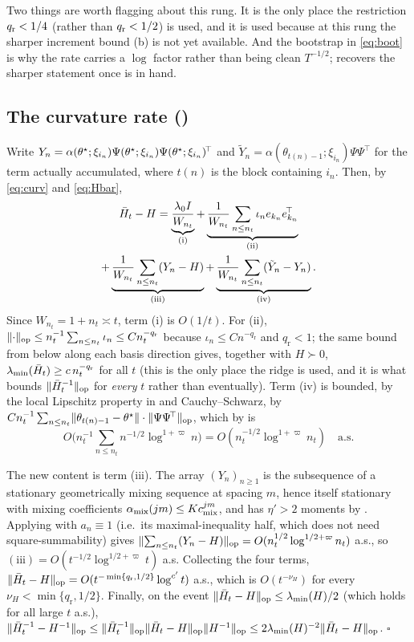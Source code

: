 \noindent
Two things are worth flagging about this rung. It is the only place the restriction
$q_{\mathrm r}<1/4$ (rather than $q_{\mathrm r}<1/2$) is used, and it is used because at this rung the sharper
increment bound (b) is not yet available. And the bootstrap in \eqref{eq:boot} is
why the rate carries a $\log$ factor rather than being clean $T^{-1/2}$; 
recovers the sharper statement once  is in hand.

\subsection{The curvature rate (\texorpdfstring{}{Theorem})}

Write $Y_n=\alpha(\theta^\star;\xi_{i_n})\Psi(\theta^\star;\xi_{i_n})\Psi(\theta^\star;\xi_{i_n})^{\!\top}$ and
$\tilde Y_n=\alpha(\theta_{t(n)-1};\xi_{i_n})\Psi\Psi^{\!\top}$ for the term actually
accumulated, where $t(n)$ is the block containing $i_n$. Then, by \eqref{eq:curv} and
\eqref{eq:Hbar},
\begin{multline}
\bar{H}_t-H
=\underbrace{\frac{\lambda_0 I}{W_{n_t}}}_{(\mathrm i)}
+\underbrace{\frac{1}{W_{n_t}}\sum_{n\le n_t}\iota_n e_{k_n}e_{k_n}^{\!\top}}_{(\mathrm{ii})}\\
+\underbrace{\frac{1}{W_{n_t}}\sum_{n\le n_t}(Y_n-H)}_{(\mathrm{iii})}
+\underbrace{\frac{1}{W_{n_t}}\sum_{n\le n_t}(\tilde Y_n-Y_n)}_{(\mathrm{iv})}.
\label{eq:Hdecomp}
\end{multline}
Since $W_{n_t}=1+n_t\asymp t$, term (i) is $O(1/t)$. For (ii),
$\lVert \cdot \rVert_{\mathrm{op}}\le n_t^{-1}\sum_{n\le n_t}\iota_n\le C n_t^{-q_{\mathrm r}}$ because
$\iota_n\le C n^{-q_{\mathrm r}}$ and $q_{\mathrm r}<1$; the same bound from below along each basis
direction gives, together with $H\succ0$,
$\lambda_{\min}(\bar{H}_t)\ge c\,n_t^{-q_{\mathrm r}}$ for all $t$ (this is the only place the ridge
is used, and it is what bounds $\lVert \bar{H}_t^{-1} \rVert_{\mathrm{op}}$ for \emph{every} $t$ rather than
eventually). Term (iv) is bounded, by the local Lipschitz property in  and
Cauchy--Schwarz, by
$Cn_t^{-1}\sum_{n\le n_t}\lVert \theta_{t(n)-1}-\theta^\star \rVert\cdot\lVert \Psi\Psi^{\!\top} \rVert_{\mathrm{op}}$, which by
 is
\[
O\Big(n_t^{-1}\sum_{n\le n_t}n^{-1/2}\log^{1+\varpi}n\Big)=O(n_t^{-1/2}\log^{1+\varpi}n_t)
\quad\text{a.s.}
\]

The new content is term (iii). The array $(Y_n)_{n\ge1}$ is the subsequence of a stationary
geometrically mixing sequence at spacing $m$, hence itself stationary with mixing
coefficients $\alpha_{\mathrm{mix}}(jm)\le Kc_{\mathrm{mix}}^{jm}$, and has $\eta'>2$ moments by
. Applying  with $a_n\equiv1$ (i.e.\ its maximal-inequality
half, which does not need square-summability) gives
$\lVert \sum_{n\le n_t}(Y_n-H) \rVert_{\mathrm{op}}=O(n_t^{1/2}\log^{1/2+\varpi}n_t)$ a.s., so
$(\mathrm{iii})=O(t^{-1/2}\log^{1/2+\varpi}t)$ a.s.
Collecting the four terms, $\lVert \bar{H}_t-H \rVert_{\mathrm{op}}=O(t^{-\min\{q_{\mathrm r},1/2\}}\log^{c'}t)$ a.s.,
which is $O(t^{-\nu_H})$ for every $\nu_H<\min\{q_{\mathrm r},1/2\}$. Finally, on the event
$\lVert \bar{H}_t-H \rVert_{\mathrm{op}}\le\lambda_{\min}(H)/2$ (which holds for all large $t$ a.s.),
$\lVert \bar{H}_t^{-1}-H^{-1} \rVert_{\mathrm{op}}\le\lVert \bar{H}_t^{-1} \rVert_{\mathrm{op}}\lVert \bar{H}_t-H \rVert_{\mathrm{op}}\lVert H^{-1} \rVert_{\mathrm{op}}
\le 2\lambda_{\min}(H)^{-2}\lVert \bar{H}_t-H \rVert_{\mathrm{op}}$. \hfill$\square$

